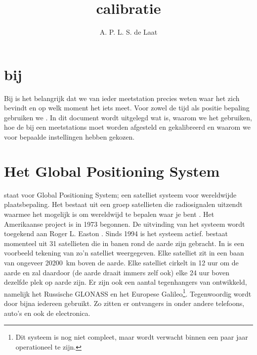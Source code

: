 

\title{\gps calibratie}
\author{A. P. L. S. de Laat}



\maketitle

\section{\gps bij \hisparc}\label{sec:gps_hisparc}

Bij \hisparc is het belangrijk dat we van ieder meetstation precies weten waar
het zich bevindt en op welk moment het iets meet. Voor zowel de
tijd als positie bepaling gebruiken we \gps. In dit document wordt
uitgelegd wat \gps is, waarom we het gebruiken, hoe de \gps bij een
\hisparc meetstations moet worden afgesteld en gekalibreerd en waarom we
voor bepaalde instellingen hebben gekozen.


\section{Het Global Positioning System}\label{sec:gps}

\gps staat voor Global Positioning System; een satelliet systeem voor
wereldwijde plaatsbepaling. Het bestaat uit een groep satellieten die
radiosignalen uitzendt waarmee het mogelijk is om wereldwijd te bepalen
waar je bent \cite{gps2013gov}. Het Amerikaanse project is in 1973
begonnen. De uitvinding van het systeem wordt toegekend aan Roger L.
Easton \cite{easton2006who}. Sinds 1994 is het systeem actief. \gps
bestaat momenteel uit 31 satellieten die in banen rond de aarde zijn
gebracht. In  is een voorbeeld tekening van
zo'n \gps satelliet weergegeven. Elke \gps satelliet zit in een baan van
ongeveer \SI{20200}{\kilo\meter} boven de aarde. Elke satelliet cirkelt
in 12 uur om de aarde en zal daardoor (de aarde draait immers zelf ook)
elke 24 uur boven dezelfde plek op aarde zijn. Er zijn ook een aantal
tegenhangers van \gps ontwikkeld, namelijk het Russische GLONASS en het
Europese Galileo\footnote{Dit systeem is nog niet compleet, maar wordt
verwacht binnen een paar jaar operationeel te zijn.}. Tegenwoordig wordt
\gps door bijna iedereen gebruikt. Zo zitten er \gps ontvangers in onder
andere telefoons, auto's en ook de \hisparc electronica.

